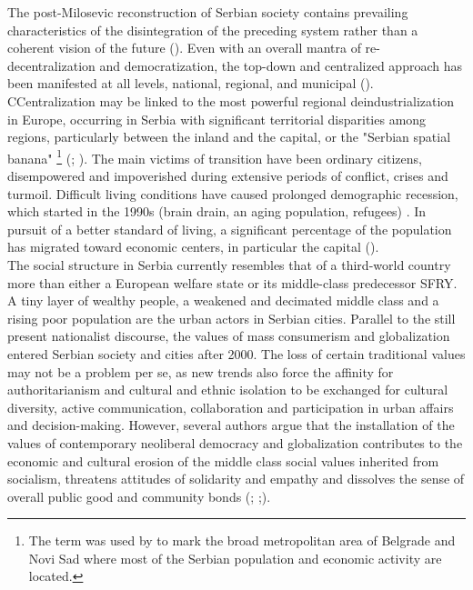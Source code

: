 \documentclass[11pt]{report}
\begin{document}
The post-Milosevic reconstruction of Serbian society contains prevailing characteristics of the disintegration of the preceding system rather than a coherent vision of the future (\href{Stanilov}{\citealt{stanilov_post-socialist_2007}}). 
Even with an overall mantra of re-decentralization and democratization, the top-down and centralized approach has been manifested at all levels,  national, regional, and municipal (\href{Vukmirovic}{\citealt{vukmirovic_city_2013}}). CCentralization may be linked to the most powerful regional deindustrialization in Europe, occurring in Serbia with significant territorial disparities among regions, particularly between the inland and the capital, or the "Serbian spatial banana"
\footnote{The term was used by \href{Vujosevic}{\cite{vujosevic_collapse_2010}}
to mark the broad metropolitan area of Belgrade and Novi Sad where most of the Serbian population and economic activity are located.}
(\href{Zekovic}{\citealt{zekovic_regionalizacija_2009}}; \href{Vukmirovic}{\citealt{vukmirovic_city_2013}}).
The main victims of transition have been ordinary citizens, disempowered and impoverished during extensive periods of conflict, crises and turmoil.
Difficult living conditions have caused prolonged demographic recession, which started in the 1990s (brain drain, an aging population, refugees) .
In pursuit of a better standard of living, a significant percentage of the population has migrated toward economic centers, in particular the capital (\href{Vukmirovic}{\citealt{vukmirovic_city_2013}}).
\\

The social structure in Serbia currently resembles that of a third-world country more than either a European welfare state or its middle-class predecessor SFRY. A tiny layer of wealthy people, a weakened and decimated middle class and a rising poor population are the urban actors in Serbian cities. Parallel to the still present nationalist discourse, the values of mass consumerism and globalization entered Serbian society and cities after 2000. The loss of certain traditional values may not be a problem per se, as new trends also force the affinity for authoritarianism and cultural and ethnic isolation to be exchanged for cultural diversity, active communication, collaboration and participation in urban affairs and decision-making. However, several authors argue that the installation of the values of contemporary neoliberal democracy and globalization contributes to the economic and cultural erosion of the middle class social values inherited from socialism, threatens attitudes of solidarity and empathy and dissolves the sense of overall public good and community bonds  (\href{Cvejic}{\citealt{cvejic_suzivot_2010}}; \href{Vukmirovic}{\citealt{vukmirovic_city_2013}};\href{Doytchinov}{\citealt{ doytchinov_belgrade_2015}}).
\end{document}
